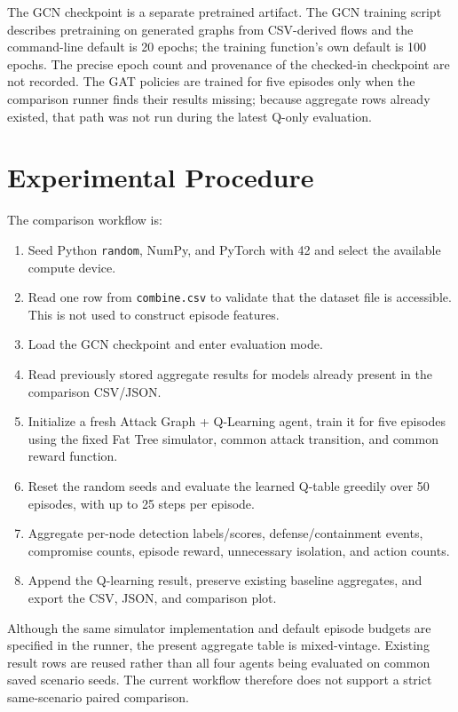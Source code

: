 \documentclass[12pt,a4paper]{report}
\newcommand{\code}[1]{\texttt{#1}}
\begin{document}
The GCN checkpoint is a separate pretrained artifact. The GCN training script describes pretraining on generated graphs from CSV-derived flows and the command-line default is 20 epochs; the training function's own default is 100 epochs. The precise epoch count and provenance of the checked-in checkpoint are not recorded. The GAT policies are trained for five episodes only when the comparison runner finds their results missing; because aggregate rows already existed, that path was not run during the latest Q-only evaluation.

\section{Experimental Procedure}

The comparison workflow is:
\begin{enumerate}[leftmargin=2em]
  \item Seed Python \code{random}, NumPy, and PyTorch with 42 and select the available compute device.
  \item Read one row from \code{combine.csv} to validate that the dataset file is accessible. This is not used to construct episode features.
  \item Load the GCN checkpoint and enter evaluation mode.
  \item Read previously stored aggregate results for models already present in the comparison CSV/JSON.
  \item Initialize a fresh Attack Graph + Q-Learning agent, train it for five episodes using the fixed Fat Tree simulator, common attack transition, and common reward function.
  \item Reset the random seeds and evaluate the learned Q-table greedily over 50 episodes, with up to 25 steps per episode.
  \item Aggregate per-node detection labels/scores, defense/containment events, compromise counts, episode reward, unnecessary isolation, and action counts.
  \item Append the Q-learning result, preserve existing baseline aggregates, and export the CSV, JSON, and comparison plot.
\end{enumerate}

Although the same simulator implementation and default episode budgets are specified in the runner, the present aggregate table is mixed-vintage. Existing result rows are reused rather than all four agents being evaluated on common saved scenario seeds. The current workflow therefore does not support a strict same-scenario paired comparison.
\end{document}
